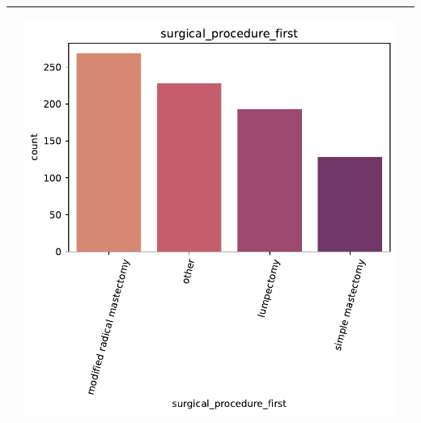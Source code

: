 \begin{table}[!htb]
\begin{threeparttable}
\begin{tabular}{p{2.5cm} p{7cm} p{6.5cm}}
			& \begin{center}\includegraphics[width=1\linewidth]{NOTEBOOK/IMAGENES_DESCRIPTIVAS/41_surgical_procedure_first}\end{center}
			\\ \hline
			
		\end{tabular}
	\end{threeparttable}
\end{table}


